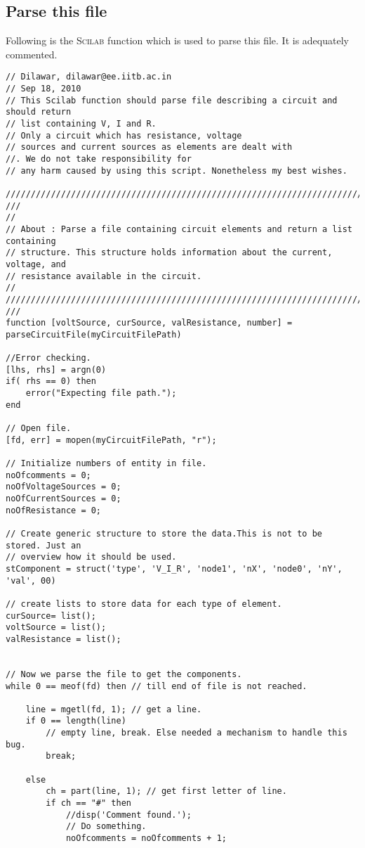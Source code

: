 \documentclass[a4paper,10pt]{article}
\begin{document}
\subsection{Parse this file}
Following is the \textsc{Scilab} function which is used to parse this
file. It is adequately commented.
\small
\begin{verbatim}
// Dilawar, dilawar@ee.iitb.ac.in
// Sep 18, 2010
// This Scilab function should parse file describing a circuit and should return
// list containing V, I and R.
// Only a circuit which has resistance, voltage
// sources and current sources as elements are dealt with
//. We do not take responsibility for
// any harm caused by using this script. Nonetheless my best wishes.

////////////////////////////////////////////////////////////////////////////////
///
//
// About : Parse a file containing circuit elements and return a list containing
// structure. This structure holds information about the current, voltage, and
// resistance available in the circuit.
//
////////////////////////////////////////////////////////////////////////////////
///
function [voltSource, curSource, valResistance, number] =
parseCircuitFile(myCircuitFilePath)

//Error checking.
[lhs, rhs] = argn(0)
if( rhs == 0) then
    error("Expecting file path.");
end

// Open file.
[fd, err] = mopen(myCircuitFilePath, "r");

// Initialize numbers of entity in file.
noOfcomments = 0;
noOfVoltageSources = 0;
noOfCurrentSources = 0;
noOfResistance = 0;

// Create generic structure to store the data.This is not to be stored. Just an
// overview how it should be used.
stComponent = struct('type', 'V_I_R', 'node1', 'nX', 'node0', 'nY', 'val', 00)

// create lists to store data for each type of element.
curSource= list();
voltSource = list();
valResistance = list();


// Now we parse the file to get the components.
while 0 == meof(fd) then // till end of file is not reached.

    line = mgetl(fd, 1); // get a line.
    if 0 == length(line)
        // empty line, break. Else needed a mechanism to handle this bug.
        break;

    else
        ch = part(line, 1); // get first letter of line.
        if ch == "#" then
            //disp('Comment found.');
            // Do something.
            noOfcomments = noOfcomments + 1;


\end{verbatim}
\end{document}
